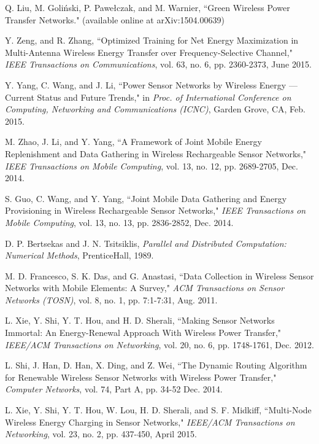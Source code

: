\documentclass[twocolumn,10pt]{IEEEtran}
\begin{document}
\begin{thebibliography}{99}
Q. Liu, M. Goliński, P. Pawełczak, and M. Warnier, ``Green Wireless Power Transfer Networks." (available online at arXiv:1504.00639)



Y. Zeng, and R. Zhang,
``Optimized Training for Net Energy Maximization in Multi-Antenna Wireless Energy Transfer over Frequency-Selective Channel,"  \emph{IEEE Transactions on Communications}, vol. 63, no. 6, pp. 2360-2373, June 2015.


Y. Yang, C. Wang, and J. Li, ``Power Sensor Networks by Wireless Energy — Current Status and Future Trends," in \emph{Proc. of International Conference on Computing, Networking and Communications (ICNC)}, Garden Grove, CA, Feb. 2015.

M. Zhao, J. Li, and Y. Yang, ``A Framework of Joint Mobile Energy Replenishment and Data Gathering in Wireless Rechargeable Sensor Networks,"  \emph{IEEE Transactions on  Mobile Computing},   vol. 13, no. 12, pp. 2689-2705, Dec. 2014.

S. Guo, C. Wang, and Y. Yang,  ``Joint Mobile Data Gathering and Energy Provisioning in Wireless Rechargeable Sensor Networks,"  \emph{IEEE Transactions on Mobile Computing}, vol. 13, no. 13, pp. 2836-2852, Dec. 2014. 
 

D. P. Bertsekas and J. N. Tsitsiklis, \emph{Parallel and Distributed Computation: Numerical Methods}, PrenticeHall, 1989. 
 
M. D. Francesco, S. K. Das, and G. Anastasi, ``Data Collection in Wireless Sensor Networks with Mobile Elements: A Survey," \emph{ACM Transactions on Sensor Networks (TOSN)}, vol. 8, no. 1, pp. 7:1-7:31, Aug. 2011.
 
L. Xie, Y. Shi, Y. T. Hou, and H. D. Sherali, ``Making Sensor Networks Immortal: An Energy-Renewal Approach With Wireless Power Transfer," \emph{IEEE/ACM Transactions on Networking}, vol. 20, no. 6, pp. 1748-1761, Dec. 2012. 


L. Shi, J. Han, D. Han, X. Ding, and Z. Wei, ``The Dynamic Routing Algorithm for Renewable Wireless Sensor Networks with Wireless Power Transfer," \emph{Computer Networks}, vol. 74, Part A, pp. 34-52  Dec. 2014. 








L. Xie, Y. Shi, Y. T. Hou, W. Lou, H. D. Sherali, and S. F. Midkiff, ``Multi-Node Wireless Energy Charging in Sensor Networks,"   \emph{IEEE/ACM Transactions on Networking}, vol. 23, no. 2, pp. 437-450, April  2015.


\end{thebibliography}
\end{document}
